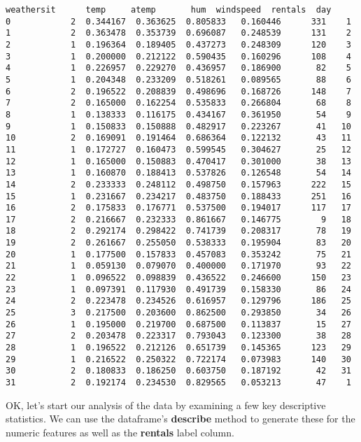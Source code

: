 \documentclass[11pt]{article}
\begin{document}
\begin{tcolorbox}[breakable, size=fbox, boxrule=.5pt, pad at break*=1mm, opacityfill=0]
\begin{Verbatim}[commandchars=\\\{\}]
    weathersit      temp     atemp       hum  windspeed  rentals  day
0            2  0.344167  0.363625  0.805833   0.160446      331    1
1            2  0.363478  0.353739  0.696087   0.248539      131    2
2            1  0.196364  0.189405  0.437273   0.248309      120    3
3            1  0.200000  0.212122  0.590435   0.160296      108    4
4            1  0.226957  0.229270  0.436957   0.186900       82    5
5            1  0.204348  0.233209  0.518261   0.089565       88    6
6            2  0.196522  0.208839  0.498696   0.168726      148    7
7            2  0.165000  0.162254  0.535833   0.266804       68    8
8            1  0.138333  0.116175  0.434167   0.361950       54    9
9            1  0.150833  0.150888  0.482917   0.223267       41   10
10           2  0.169091  0.191464  0.686364   0.122132       43   11
11           1  0.172727  0.160473  0.599545   0.304627       25   12
12           1  0.165000  0.150883  0.470417   0.301000       38   13
13           1  0.160870  0.188413  0.537826   0.126548       54   14
14           2  0.233333  0.248112  0.498750   0.157963      222   15
15           1  0.231667  0.234217  0.483750   0.188433      251   16
16           2  0.175833  0.176771  0.537500   0.194017      117   17
17           2  0.216667  0.232333  0.861667   0.146775        9   18
18           2  0.292174  0.298422  0.741739   0.208317       78   19
19           2  0.261667  0.255050  0.538333   0.195904       83   20
20           1  0.177500  0.157833  0.457083   0.353242       75   21
21           1  0.059130  0.079070  0.400000   0.171970       93   22
22           1  0.096522  0.098839  0.436522   0.246600      150   23
23           1  0.097391  0.117930  0.491739   0.158330       86   24
24           2  0.223478  0.234526  0.616957   0.129796      186   25
25           3  0.217500  0.203600  0.862500   0.293850       34   26
26           1  0.195000  0.219700  0.687500   0.113837       15   27
27           2  0.203478  0.223317  0.793043   0.123300       38   28
28           1  0.196522  0.212126  0.651739   0.145365      123   29
29           1  0.216522  0.250322  0.722174   0.073983      140   30
30           2  0.180833  0.186250  0.603750   0.187192       42   31
31           2  0.192174  0.234530  0.829565   0.053213       47    1
\end{Verbatim}
\end{tcolorbox}
        
    OK, let's start our analysis of the data by examining a few key
descriptive statistics. We can use the dataframe's \textbf{describe}
method to generate these for the numeric features as well as the
\textbf{rentals} label column.
\end{document}
